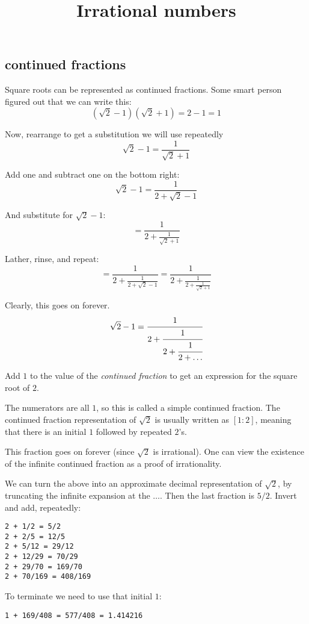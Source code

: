\documentclass[11pt, oneside]{article}
\title{Irrational numbers}
\date{}
\begin{document}
\maketitle
\Large

\subsection*{continued fractions}
Square roots can be represented as continued fractions.  Some smart person figured out that we can write this:
\[ (\sqrt{2} - 1)(\sqrt{2} + 1) = 2 - 1 = 1 \]

Now, rearrange to get a substitution we will use repeatedly
\[ \sqrt{2} - 1 = \frac{1}{\sqrt{2} + 1} \]

Add one and subtract one on the bottom right:
\[ \sqrt{2} - 1 =  \frac{1}{2 + \sqrt{2} - 1} \]

And substitute for $\sqrt{2} - 1$:
\[ = \frac{1}{2 + \frac{1}{\sqrt{2} + 1}} \]

Lather, rinse, and repeat:
\[ = \frac{1}{2 + \frac{1}{2 + \sqrt{2} - 1}} = \frac{1}{2 + \frac{1}{2 + \frac{1}{\sqrt{2} + 1} }} \]

Clearly, this goes on forever.
\[ \sqrt{2} - 1 =  \cfrac{1}{2+\cfrac{1}{2+\cfrac{1}{2 + \dots}}}  \]

Add $1$ to the value of the \emph{continued fraction} to get an expression for the square root of $2$.

The numerators are all $1$, so this is called a simple continued fraction.  The continued fraction representation of $\sqrt{2}$ is usually written as $[1:2]$, meaning that there is an initial $1$ followed by repeated $2$'s.

This fraction goes on forever (since $\sqrt{2}$ is irrational).  One can view the existence of the infinite continued fraction as a proof of irrationality.

We can turn the above into an approximate decimal representation of $\sqrt{2}$, by truncating the infinite expansion at the $\dots$.  Then the last fraction is $5/2$.  Invert and add, repeatedly:

\begin{verbatim}
2 + 1/2 = 5/2
2 + 2/5 = 12/5
2 + 5/12 = 29/12
2 + 12/29 = 70/29
2 + 29/70 = 169/70
2 + 70/169 = 408/169
\end{verbatim}

To terminate we need to use that initial $1$:
\begin{verbatim}
1 + 169/408 = 577/408 = 1.414216
\end{verbatim}
\end{document}
